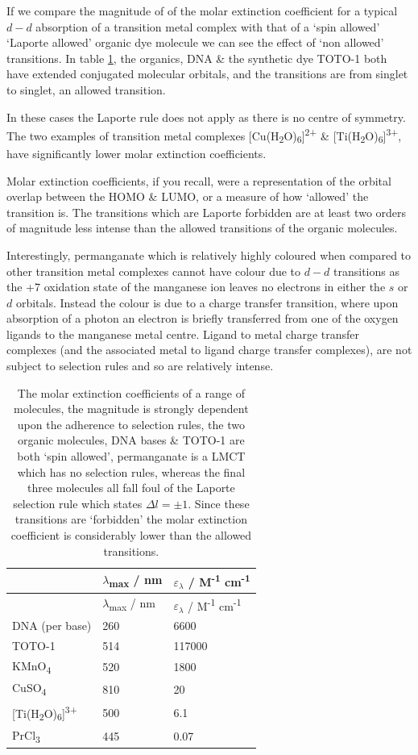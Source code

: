 \documentclass[
]{book}
\begin{document}
If we compare the magnitude of of the molar extinction coefficient for a typical \(d-d\) absorption of a transition metal complex with that of a `spin allowed' `Laporte allowed' organic dye molecule we can see the effect of `non allowed' transitions. In table \ref{tab:extcoeff}, the organics, DNA \& the synthetic dye TOTO-1 both have extended conjugated molecular orbitals, and the transitions are from singlet to singlet, an allowed transition.

In these cases the Laporte rule does not apply as there is no centre of symmetry. The two examples of transition metal complexes {[}Cu(H\textsubscript{2}O)\textsubscript{6}{]}\textsuperscript{2+} \& {[}Ti(H\textsubscript{2}O)\textsubscript{6}{]}\textsuperscript{3+}, have significantly lower molar extinction coefficients.

Molar extinction coefficients, if you recall, were a representation of the orbital overlap between the HOMO \& LUMO, or a measure of how `allowed' the transition is. The transitions which are Laporte forbidden are at least two orders of magnitude less intense than the allowed transitions of the organic molecules.

Interestingly, permanganate which is relatively highly coloured when compared to other transition metal complexes cannot have colour due to \(d-d\) transitions as the +7 oxidation state of the manganese ion leaves no electrons in either the \(s\) or \(d\) orbitals. Instead the colour is due to a charge transfer transition, where upon absorption of a photon an electron is briefly transferred from one of the oxygen ligands to the manganese metal centre. Ligand to metal charge transfer complexes (and the associated metal to ligand charge transfer complexes), are not subject to selection rules and so are relatively intense.

\begin{longtable}[]{@{}lll@{}}
\caption{\label{tab:extcoeff} The molar extinction coefficients of a range of molecules, the magnitude is strongly dependent upon the adherence to selection rules, the two organic molecules, DNA bases \& TOTO-1 are both `spin allowed', permanganate is a LMCT which has no selection rules, whereas the final three molecules all fall foul of the Laporte selection rule which states \(\Delta l = \pm 1\). Since these transitions are `forbidden' the molar extinction coefficient is considerably lower than the allowed transitions.}\tabularnewline
\toprule
& \(\lambda\)\textsubscript{max} / nm & \(\varepsilon _{\lambda}\) / M\textsuperscript{-1} cm\textsuperscript{-1}\tabularnewline
\midrule
\endfirsthead
\toprule
& \(\lambda\)\textsubscript{max} / nm & \(\varepsilon _{\lambda}\) / M\textsuperscript{-1} cm\textsuperscript{-1}\tabularnewline
\midrule
\endhead
DNA (per base) & 260 & 6600\tabularnewline
TOTO-1 & 514 & 117000\tabularnewline
KMnO\textsubscript{4} & 520 & 1800\tabularnewline
CuSO\textsubscript{4} & 810 & 20\tabularnewline
{[}Ti(H\textsubscript{2}O)\textsubscript{6}{]}\textsuperscript{3+} & 500 & 6.1\tabularnewline
PrCl\textsubscript{3} & 445 & 0.07\tabularnewline
\bottomrule
\end{longtable}
\end{document}
